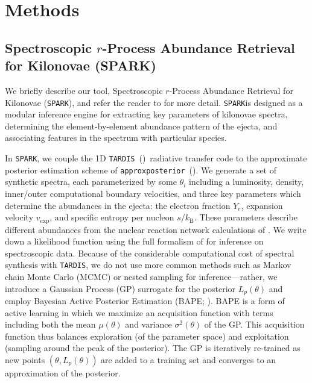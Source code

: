 \documentclass[twocolumn, twocolappendix]{aastex63}
\def\SPARK{\texttt{SPARK}}
\def\TARDIS{\texttt{TARDIS}}
\def\approxposterior{\texttt{approxposterior}}
\begin{document}

\section{Methods}\label{sec:methods}

\subsection{Spectroscopic $r$-Process Abundance Retrieval for Kilonovae (\textsc{SPARK})}\label{ssc:spark-summary}

We briefly describe our tool, Spectroscopic $r$-Process Abundance Retrieval for Kilonovae (\SPARK), and refer the reader to \cite{vieira23} for more detail. \SPARK is designed as a modular inference engine for extracting key parameters of kilonovae spectra, determining the element-by-element abundance pattern of the ejecta, and associating features in the spectrum with particular species. 

In \SPARK, we couple the 1D \TARDIS~(\citealt{kerzendorf14})~radiative transfer code to the approximate posterior estimation scheme of \approxposterior~(\citealt{fleming18,fleming20}). We generate a set of synthetic spectra, each parameterized by some $\theta_i$ including a luminosity, density, inner/outer computational boundary velocities, and three key parameters which determine the abundances in the ejecta: the electron fraction $Y_e$, expansion velocity $v_{\mathrm{exp}}$, and specific entropy per nucleon $s / k_{\mathrm{B}}$. These parameters describe different abundances from the nuclear reaction network calculations of \cite{wanajo18}. We write down a likelihood function using the full formalism of \cite{czekala15} for inference on spectroscopic data. Because of the considerable computational cost of spectral synthesis with \TARDIS, we do not use more common methods such as Markov chain Monte Carlo (MCMC) or nested sampling for inference---rather, we introduce a Gaussian Process (GP) surrogate for the posterior $L_p (\theta)$ and employ Bayesian Active Posterior Estimation (BAPE; \citealt{kandasamy17}). BAPE is a form of active learning in which we maximize an acquisition function with terms including both the mean $\mu(\theta)$ and variance $\sigma^2(\theta)$ of the GP. This acquisition function thus balances exploration (of the parameter space) and exploitation (sampling around the peak of the posterior). The GP is iteratively re-trained as new points $(\theta, L_p(\theta))$ are added to a training set and converges to an approximation of the posterior. 
\end{document}
